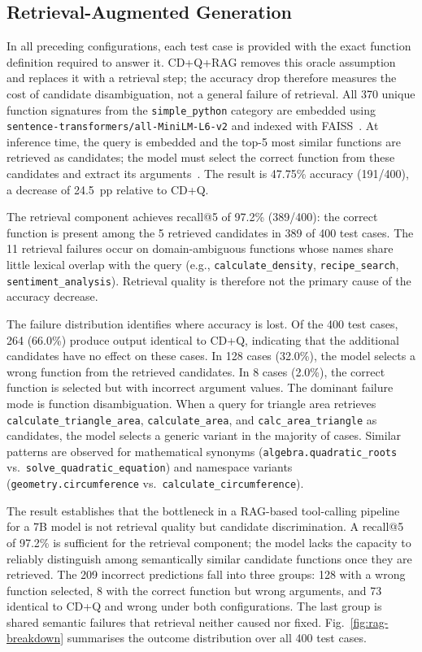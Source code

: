 \subsection{Retrieval-Augmented Generation}

In all preceding configurations, each test case is provided with the exact
function definition required to answer it. CD+Q+RAG removes this oracle
assumption and replaces it with a retrieval step; the accuracy drop therefore
measures the cost of candidate disambiguation, not a general failure of
retrieval. All 370 unique function signatures from the
\texttt{simple\_python} category are embedded using
\texttt{sentence-transformers/all-MiniLM-L6-v2} and indexed with
FAISS~\cite{johnson2019billion}. At inference time, the query is embedded and
the top-5 most similar functions are retrieved as candidates; the model must
select the correct function from these candidates and extract its
arguments~\cite{lewis2020retrieval}. The result is 47.75\% accuracy
(191/400), a decrease of 24.5~pp relative to CD+Q.

The retrieval component achieves recall@5 of 97.2\% (389/400): the correct
function is present among the 5 retrieved candidates in 389 of 400 test cases.
The 11 retrieval failures occur on domain-ambiguous functions whose names share
little lexical overlap with the query (e.g., \texttt{calculate\_density},
\texttt{recipe\_search}, \texttt{sentiment\_analysis}). Retrieval quality is
therefore not the primary cause of the accuracy decrease.

The failure distribution identifies where accuracy is lost. Of the 400 test
cases, 264 (66.0\%) produce output identical to CD+Q, indicating that
the additional candidates have no effect on these cases. In 128 cases (32.0\%),
the model selects a wrong function from the retrieved candidates. In 8 cases
(2.0\%), the correct function is selected but with incorrect argument values.
The dominant failure mode is function disambiguation. When a query for triangle
area retrieves \texttt{calculate\_triangle\_area}, \texttt{calculate\_area}, and
\texttt{calc\_area\_triangle} as candidates, the model selects a generic variant
in the majority of cases. Similar patterns are observed for mathematical
synonyms (\texttt{algebra.quadratic\_roots} vs.\ \texttt{solve\_quadratic\_equation})
and namespace variants (\texttt{geometry.circumference} vs.\
\texttt{calculate\_circumference}).

The result establishes that the bottleneck in a RAG-based tool-calling pipeline
for a 7B model is not retrieval quality but candidate discrimination. A
recall@5 of 97.2\% is sufficient for the retrieval component; the model lacks
the capacity to reliably distinguish among semantically similar candidate
functions once they are retrieved. The 209 incorrect predictions fall into
three groups: 128 with a wrong function selected, 8 with the correct function
but wrong arguments, and 73 identical to CD+Q and wrong under both
configurations. The last group is shared semantic failures that retrieval
neither caused nor fixed. Fig.~\ref{fig:rag-breakdown} summarises the outcome
distribution over all 400 test cases.

